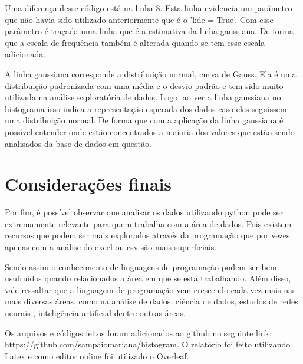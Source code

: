 \documentclass[a4paper, 12pt]{article}
\begin{document}
Uma diferença desse código está na linha 8. Esta linha evidencia um parâmetro que não havia sido utilizado anteriormente que é o 'kde = True'. Com esse parâmetro é traçada uma linha que é a estimativa da linha gaussiana. De forma que a escala de frequência também é alterada quando se tem esse escala adicionada. 

A linha gaussiana corresponde a distribuição normal, curva de Gauss. Ela é uma distribuição padronizada com uma média e o desvio padrão e tem sido muito utilizada na análise exploratória de dados. Logo, ao ver a linha gaussiana no histograma isso indica a representação esperada dos dados caso eles seguissem uma distribuição normal. De forma que com a aplicação da linha gaussiana é possível entender onde estão concentrados a maioria dos valores que estão sendo analisados da base de dados em questão.

\newpage
\section{Considerações finais}


Por fim, é possível observar que analisar os dados utilizando python pode ser extremamente relevante para quem trabalha com a área de dados. Pois existem recursos que podem ser mais explorados através da programação que por vezes apenas com a análise do excel ou csv são mais superficiais. 

Sendo assim o conhecimento de linguagens de programação podem ser bem usufruídos quando relacionados a área em que se está trabalhando. Além disso, vale ressaltar que a linguagem de programação vem crescendo cada vez mais nas mais diversas áreas, como na análise de dados, ciência de dados, estudos de redes neurais , inteligência artificial dentre outras áreas.

Os arquivos e códigos feitos foram adicionados ao github no seguinte link: https://github.com/sampaiomariana/histogram. O relatório foi feito utilizando Latex e como editor online foi utilizado o Overleaf.

\newpage
{}
\end{document}
